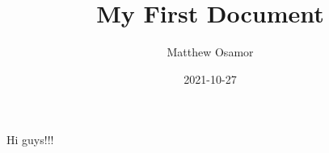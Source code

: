 \documentclass{article}
\title{My First Document}
\date{2021-10-27}
\author{Matthew Osamor}
\begin{document}
	\maketitle
	\newpage
	Hi guys!!!
	
\end{document}
